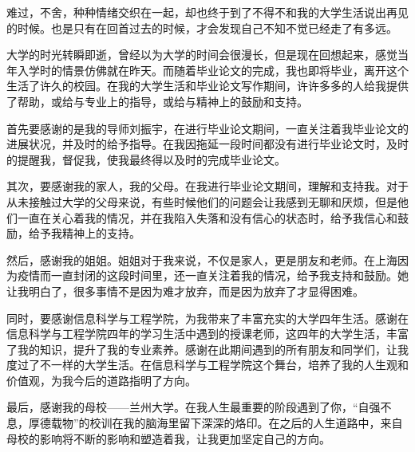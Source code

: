 \documentclass[AutoFakeBold]{LZUThesis}
\begin{document}
\backmatter


\printbib








\Thanks
难过，不舍，种种情绪交织在一起，却也终于到了不得不和我的大学生活说出再见的时候。也是只有在回首过去的时候，才会发现自己不知不觉已经走了有多远。

大学的时光转瞬即逝，曾经以为大学的时间会很漫长，但是现在回想起来，感觉当年入学时的情景仿佛就在昨天。而随着毕业论文的完成，我也即将毕业，离开这个生活了许久的校园。在我的大学生活和毕业论文写作期间，许许多多的人给我提供了帮助，或给与专业上的指导，或给与精神上的鼓励和支持。

首先要感谢的是我的导师刘振宇，在进行毕业论文期间，一直关注着我毕业论文的进展状况，并及时的给予指导。在我因拖延一段时间都没有进行毕业论文时，及时的提醒我，督促我，使我最终得以及时的完成毕业论文。

其次，要感谢我的家人，我的父母。在我进行毕业论文期间，理解和支持我。对于从未接触过大学的父母来说，有些时候他们的问题会让我感到无聊和厌烦，但是他们一直在关心着我的情况，并在我陷入失落和没有信心的状态时，给予我信心和鼓励，给予我精神上的支持。

然后，感谢我的姐姐。姐姐对于我来说，不仅是家人，更是朋友和老师。在上海因为疫情而一直封闭的这段时间里，还一直关注着我的情况，给予我支持和鼓励。她让我明白了，很多事情不是因为难才放弃，而是因为放弃了才显得困难。

同时，要感谢信息科学与工程学院，为我带来了丰富充实的大学四年生活。感谢在信息科学与工程学院四年的学习生活中遇到的授课老师，这四年的大学生活，丰富了我的知识，提升了我的专业素养。感谢在此期间遇到的所有朋友和同学们，让我度过了不一样的大学生活。在信息科学与工程学院这个舞台，培养了我的人生观和价值观，为我今后的道路指明了方向。

最后，感谢我的母校——兰州大学。在我人生最重要的阶段遇到了你，“自强不息，厚德载物”的校训在我的脑海里留下深深的烙印。在之后的人生道路中，来自母校的影响将不断的影响和塑造着我，让我更加坚定自己的方向。
\end{document}
